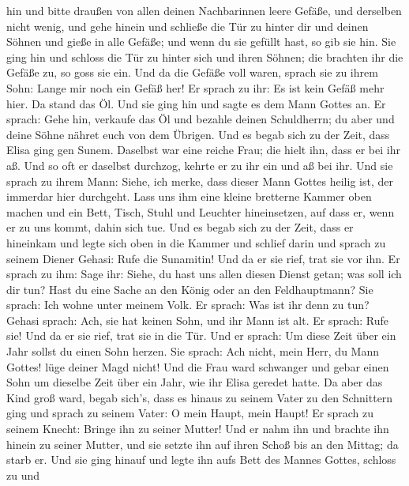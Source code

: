 hin und bitte draußen von allen deinen Nachbarinnen leere Gefäße, und
derselben nicht wenig,  und gehe hinein und schließe die Tür
zu hinter dir und deinen Söhnen und gieße in alle Gefäße; und wenn du
sie gefüllt hast, so gib sie hin.  Sie ging hin und schloss
die Tür zu hinter sich und ihren Söhnen; die brachten ihr die Gefäße zu,
so goss sie ein.  Und da die Gefäße voll waren, sprach sie
zu ihrem Sohn: Lange mir noch ein Gefäß her! Er sprach zu ihr: Es ist
kein Gefäß mehr hier. Da stand das Öl.  Und sie ging hin und
sagte es dem Mann Gottes an. Er sprach: Gehe hin, verkaufe das Öl und
bezahle deinen Schuldherrn; du aber und deine Söhne nähret euch von dem
Übrigen.  Und es begab sich zu der Zeit, dass Elisa ging gen
Sunem. Daselbst war eine reiche Frau; die hielt ihn, dass er bei ihr aß.
Und so oft er daselbst durchzog, kehrte er zu ihr ein und aß bei ihr.
 Und sie sprach zu ihrem Mann: Siehe, ich merke, dass dieser
Mann Gottes heilig ist, der immerdar hier durchgeht.  Lass
uns ihm eine kleine bretterne Kammer oben machen und ein Bett, Tisch,
Stuhl und Leuchter hineinsetzen, auf dass er, wenn er zu uns kommt,
dahin sich tue.  Und es begab sich zu der Zeit, dass er
hineinkam und legte sich oben in die Kammer und schlief darin
 und sprach zu seinem Diener Gehasi: Rufe die Sunamitin!
Und da er sie rief, trat sie vor ihn.  Er sprach zu ihm:
Sage ihr: Siehe, du hast uns allen diesen Dienst getan; was soll ich dir
tun? Hast du eine Sache an den König oder an den Feldhauptmann? Sie
sprach: Ich wohne unter meinem Volk.  Er sprach: Was ist
ihr denn zu tun? Gehasi sprach: Ach, sie hat keinen Sohn, und ihr Mann
ist alt.  Er sprach: Rufe sie! Und da er sie rief, trat sie
in die Tür.  Und er sprach: Um diese Zeit über ein Jahr
sollst du einen Sohn herzen. Sie sprach: Ach nicht, mein Herr, du Mann
Gottes! lüge deiner Magd nicht!  Und die Frau ward
schwanger und gebar einen Sohn um dieselbe Zeit über ein Jahr, wie ihr
Elisa geredet hatte.  Da aber das Kind groß ward, begab
sich's, dass es hinaus zu seinem Vater zu den Schnittern ging
 und sprach zu seinem Vater: O mein Haupt, mein Haupt! Er
sprach zu seinem Knecht: Bringe ihn zu seiner Mutter!  Und
er nahm ihn und brachte ihn hinein zu seiner Mutter, und sie setzte ihn
auf ihren Schoß bis an den Mittag; da starb er.  Und sie
ging hinauf und legte ihn aufs Bett des Mannes Gottes, schloss zu und
